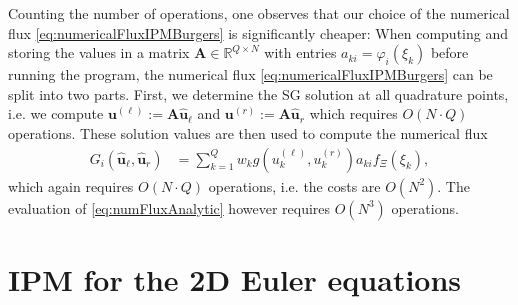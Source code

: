 Counting the number of operations, one observes that our choice of the numerical flux \eqref{eq:numericalFluxIPMBurgers} is significantly cheaper: When computing and storing the values in a matrix $\bm A\in\mathbb{R}^{Q\times N}$ with entries $a_{ki} = \varphi_i(\xi_k)$ before running the program, the numerical flux \eqref{eq:numericalFluxIPMBurgers} can be split into two parts. First, we determine the SG solution at all quadrature points, i.e. we compute $\bm{u}^{(\ell)} := \bm A \bm{\hat u}_{\ell}$ and $\bm{u}^{(r)} := \bm A \bm{\hat u}_{r}$ which requires $O(N\cdot Q)$ operations. These solution values are then used to compute the numerical flux
\begin{align*}
G_i(\bm{\hat u}_{\ell},\bm{\hat u}_{r}) &= \sum_{k=1}^Q w_k g(u^{(\ell)}_k,u^{(r)}_k)a_{ki}f_{\Xi}(\xi_k),
\end{align*}
which again requires $O(N\cdot Q)$ operations, i.e. the costs are $O(N^2)$. The evaluation of \eqref{eq:numFluxAnalytic} however requires $O(N^3)$ operations.

\section{IPM for the 2D Euler equations}
\label{app:IPM2DEuler}

